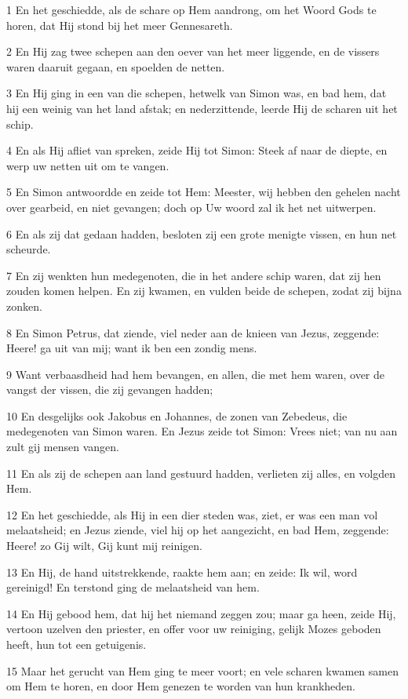 \par 1 En het geschiedde, als de schare op Hem aandrong, om het Woord Gods te horen, dat Hij stond bij het meer Gennesareth.
\par 2 En Hij zag twee schepen aan den oever van het meer liggende, en de vissers waren daaruit gegaan, en spoelden de netten.
\par 3 En Hij ging in een van die schepen, hetwelk van Simon was, en bad hem, dat hij een weinig van het land afstak; en nederzittende, leerde Hij de scharen uit het schip.
\par 4 En als Hij afliet van spreken, zeide Hij tot Simon: Steek af naar de diepte, en werp uw netten uit om te vangen.
\par 5 En Simon antwoordde en zeide tot Hem: Meester, wij hebben den gehelen nacht over gearbeid, en niet gevangen; doch op Uw woord zal ik het net uitwerpen.
\par 6 En als zij dat gedaan hadden, besloten zij een grote menigte vissen, en hun net scheurde.
\par 7 En zij wenkten hun medegenoten, die in het andere schip waren, dat zij hen zouden komen helpen. En zij kwamen, en vulden beide de schepen, zodat zij bijna zonken.
\par 8 En Simon Petrus, dat ziende, viel neder aan de knieen van Jezus, zeggende: Heere! ga uit van mij; want ik ben een zondig mens.
\par 9 Want verbaasdheid had hem bevangen, en allen, die met hem waren, over de vangst der vissen, die zij gevangen hadden;
\par 10 En desgelijks ook Jakobus en Johannes, de zonen van Zebedeus, die medegenoten van Simon waren. En Jezus zeide tot Simon: Vrees niet; van nu aan zult gij mensen vangen.
\par 11 En als zij de schepen aan land gestuurd hadden, verlieten zij alles, en volgden Hem.
\par 12 En het geschiedde, als Hij in een dier steden was, ziet, er was een man vol melaatsheid; en Jezus ziende, viel hij op het aangezicht, en bad Hem, zeggende: Heere! zo Gij wilt, Gij kunt mij reinigen.
\par 13 En Hij, de hand uitstrekkende, raakte hem aan; en zeide: Ik wil, word gereinigd! En terstond ging de melaatsheid van hem.
\par 14 En Hij gebood hem, dat hij het niemand zeggen zou; maar ga heen, zeide Hij, vertoon uzelven den priester, en offer voor uw reiniging, gelijk Mozes geboden heeft, hun tot een getuigenis.
\par 15 Maar het gerucht van Hem ging te meer voort; en vele scharen kwamen samen om Hem te horen, en door Hem genezen te worden van hun krankheden.
